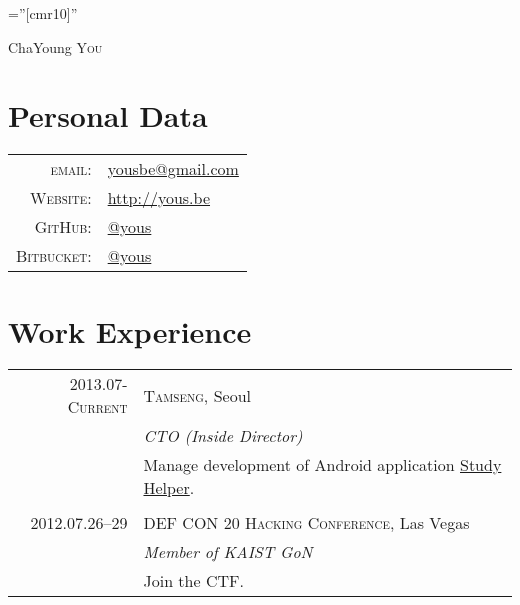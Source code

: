 \documentclass[a4paper,10pt]{article}
\begin{document}

\pagestyle{empty} %

\font\fb=''[cmr10]'' %

\par{\centering
{\Huge ChaYoung \textsc{You}
}\bigskip\par}

\section{Personal Data}

\begin{tabular}{rl}
  \textsc{email:}     & \href{mailto:yousbe@gmail.com}{yousbe@gmail.com} \\
  \textsc{Website:}   & \url{http://yous.be} \\
  \textsc{GitHub:}    & \href{https://github.com/yous}{@yous} \\
  \textsc{Bitbucket:} & \href{https://bitbucket.org/yous}{@yous}
\end{tabular}

\section{Work Experience}
\begin{tabular}{r|p{11cm}}
  \textsc{2013.07-Current} & \textsc{Tamseng}, Seoul \\
  & \emph{CTO (Inside Director)} \\
  & Manage development of Android application \href{https://play.google.com/store/apps/details?id=kr.co.tamseng.StudyHelper}{Study Helper}. \\
  \multicolumn{2}{c}{} \\

  \textsc{2012.07.26--29} & \textsc{DEF CON 20 Hacking Conference}, Las Vegas \\
  & \emph{Member of KAIST GoN} \\
  & Join the CTF.
\end{tabular}
\end{document}
